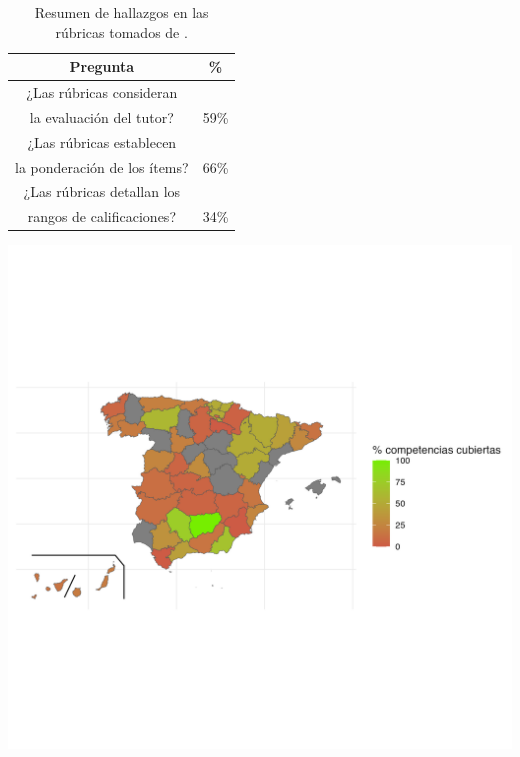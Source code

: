 \begin{table}[!ht]
    
    \begin{varwidth}[b]{0.45\linewidth}
        \centering
         \caption{Resumen de hallazgos en las rúbricas tomados de \cite{fernandez2023evaluacion}.}
            \begin{tabular}{c c}
            \toprule
            \textbf{Pregunta} & \textbf{\%} \\
            \midrule
            ¿Las rúbricas consideran & \\
            la evaluación del tutor? & 59\% \\
            ¿Las rúbricas establecen & \\
            la ponderación de los ítems? &  66\% \\
            ¿Las rúbricas detallan los & \\
            rangos de calificaciones? & 34\%  \\
            \bottomrule
        \end{tabular}
       
        \label{tab:rubricas}
       \end{varwidth}\hfill
    \begin{minipage}[b]{0.5\linewidth}
        \centering
        \includegraphics[scale=0.5, trim={0 5cm 5cm 5cm}, clip]{images/Mapa_prov.png}
        \label{fig:image}
    \end{minipage}
\end{table}

